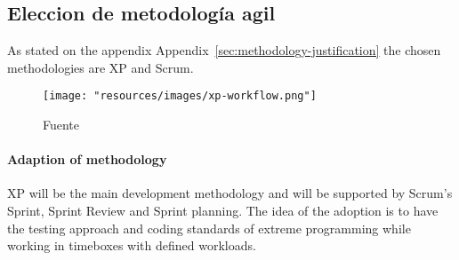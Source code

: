 \subsection{Eleccion de metodología agil}

As stated on the appendix Appendix~\ref{sec:methodology-justification} the chosen methodologies are XP and Scrum.

\begin{figure}
    \texttt{[image: "resources/images/xp-workflow.png"]}
    \caption{Fuente \textcite{abrahamsson2017agile}}\label{fig:xp-workflow}
\end{figure}

\paragraph{Adaption of methodology} XP will be the main development methodology and will be supported by Scrum's Sprint, Sprint Review and Sprint planning.
The idea of the adoption is to have the testing approach and coding standards of extreme programming while working in timeboxes with defined workloads.


